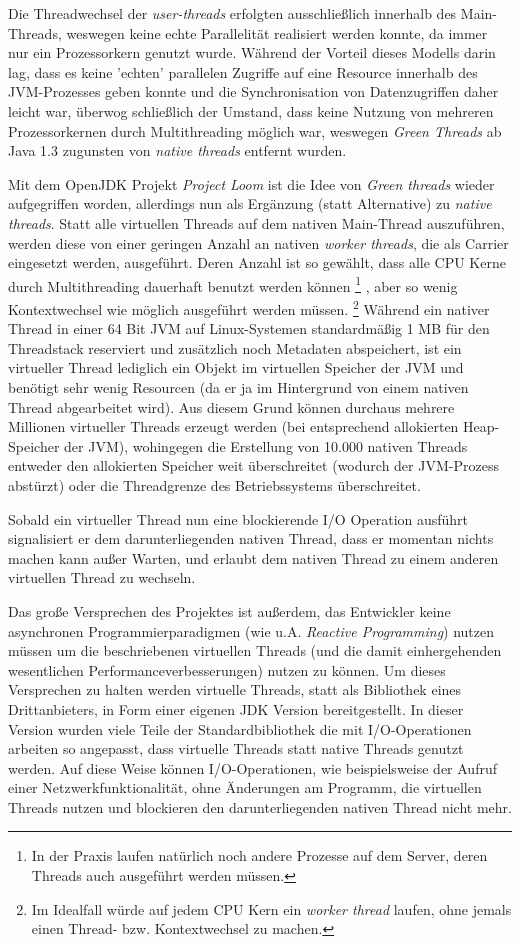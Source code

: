 Die Threadwechsel der \textit{user-threads} erfolgten ausschließlich innerhalb des Main-Threads, weswegen keine echte Parallelität realisiert werden konnte,
da immer nur ein Prozessorkern genutzt wurde.
Während der Vorteil dieses Modells darin lag, dass es keine 'echten' parallelen Zugriffe auf eine Resource innerhalb des JVM-Prozesses geben konnte
und die Synchronisation von Datenzugriffen daher leicht war, überwog schließlich der Umstand, dass keine Nutzung von mehreren Prozessorkernen
durch Multithreading möglich war, weswegen \textit{Green Threads} ab Java 1.3 zugunsten von \textit{native threads} entfernt wurden.

Mit dem OpenJDK Projekt \textit{Project Loom} ist die Idee von \textit{Green threads}
wieder aufgegriffen worden, allerdings nun als Ergänzung (statt Alternative) zu \textit{native threads}.
Statt alle virtuellen Threads auf dem nativen Main-Thread auszuführen, werden diese von einer geringen Anzahl an nativen \textit{worker threads},
die als Carrier eingesetzt werden, ausgeführt.
Deren Anzahl ist so gewählt, dass alle CPU Kerne durch Multithreading dauerhaft benutzt werden können
\footnote{In der Praxis laufen natürlich noch andere Prozesse auf dem Server, deren Threads auch ausgeführt werden müssen.}
, aber so wenig Kontextwechsel wie möglich ausgeführt werden müssen.
\parencite{Oracle2021} \footnote{Im Idealfall würde auf jedem CPU Kern ein \textit{worker thread} laufen,
	ohne jemals einen Thread- bzw. Kontextwechsel zu machen.}
Während ein nativer Thread in einer 64 Bit JVM auf Linux-Systemen standardmäßig 1 MB für den Threadstack reserviert
und zusätzlich noch Metadaten abspeichert, ist ein virtueller Thread
lediglich ein Objekt im virtuellen Speicher der JVM und benötigt sehr wenig Resourcen (da er ja im Hintergrund von einem
nativen Thread abgearbeitet wird).
Aus diesem Grund können durchaus mehrere Millionen virtueller Threads erzeugt werden (bei entsprechend allokierten Heap-Speicher der JVM), wohingegen
die Erstellung von 10.000 nativen Threads entweder den allokierten Speicher weit überschreitet (wodurch der JVM-Prozess abstürzt) oder die Threadgrenze
des Betriebssystems überschreitet.

Sobald ein virtueller Thread nun eine blockierende I/O Operation ausführt signalisiert er dem darunterliegenden nativen Thread, dass er momentan nichts machen
kann außer Warten, und erlaubt dem nativen Thread zu einem anderen virtuellen Thread zu wechseln.

Das große Versprechen des Projektes ist außerdem, das Entwickler keine asynchronen Programmierparadigmen (wie u.A. \textit{Reactive Programming})
nutzen müssen um die beschriebenen virtuellen Threads (und die damit einhergehenden wesentlichen Performanceverbesserungen) nutzen zu können.
Um dieses Versprechen zu halten werden virtuelle Threads, statt als Bibliothek eines Drittanbieters, in Form einer eigenen JDK Version bereitgestellt.
In dieser Version wurden viele Teile der Standardbibliothek die mit I/O-Operationen arbeiten so angepasst, dass virtuelle Threads statt native Threads
genutzt werden. Auf diese Weise können I/O-Operationen, wie beispielsweise der Aufruf einer Netzwerkfunktionalität, ohne Änderungen am Programm,
die virtuellen Threads nutzen und blockieren den darunterliegenden nativen Thread nicht mehr.

